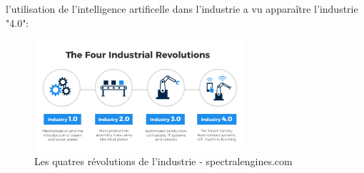 l'utilisation de l'intelligence artificelle dans l'industrie a vu apparaître 
l'industrie "4.0":

\begin{figure}[H]
    \centering
    \includegraphics[width=0.7\textwidth]{Images/industryfour}
    \caption{Les quatres révolutions de l'industrie - spectralengines.com}
	\label{fig:deepneuralnetwork}
\end{figure}

